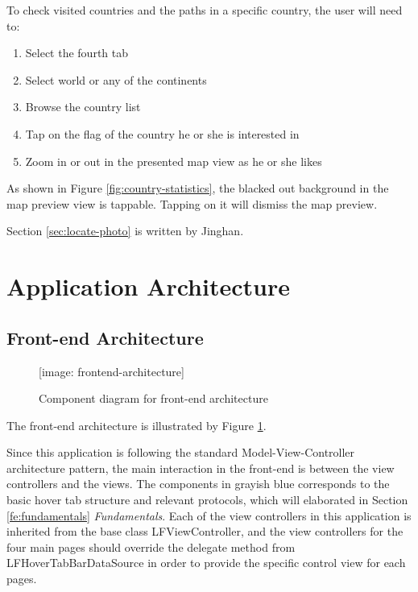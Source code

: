 \documentclass[12pt,a4paper]{article}
\renewcommand\texttt[1]{{\ttfamily\color{textttColor}#1}}
\begin{document}
            To check visited countries and the paths in a specific country, the user will need to:
            \begin{enumerate}
                \item Select the fourth tab
                \item Select world or any of the continents
                \item Browse the country list
                \item Tap on the flag of the country he or she is interested in
                \item Zoom in or out in the presented map view as he or she likes
            \end{enumerate}
            As shown in Figure \ref{fig:country-statistics}, the blacked out background in the map preview view is tappable. Tapping on it will dismiss the map preview. 
            
            \footnotesize
            Section \ref{sec:locate-photo} is written by Jinghan.
            \normalsize
    \clearpage    
    
    
    \section{Application Architecture}
        \label{sec:architecture}
        \subsection{Front-end Architecture}
        \begin{figure}[H]
            \texttt{[image: frontend-architecture]}
            \centering
            \caption{Component diagram for front-end architecture}
            \label{fig:fe-classdiagram}
        \end{figure}
        
        The front-end architecture is illustrated by Figure \ref{fig:fe-classdiagram}.
        
        Since this application is following the standard Model-View-Controller architecture pattern, the main interaction in the front-end is between the view controllers and the views. The components in \textcolor{grayishblue}{grayish blue} corresponds to the basic hover tab structure and relevant protocols, which will elaborated in Section \ref{fe:fundamentals} \textit{Fundamentals}. Each of the view controllers in this application is inherited from the base class \texttt{LFViewController}, and the view controllers for the four main pages should override the delegate method from \texttt{LFHoverTabBarDataSource} in order to provide the specific control view for each pages.
        
\end{document}
